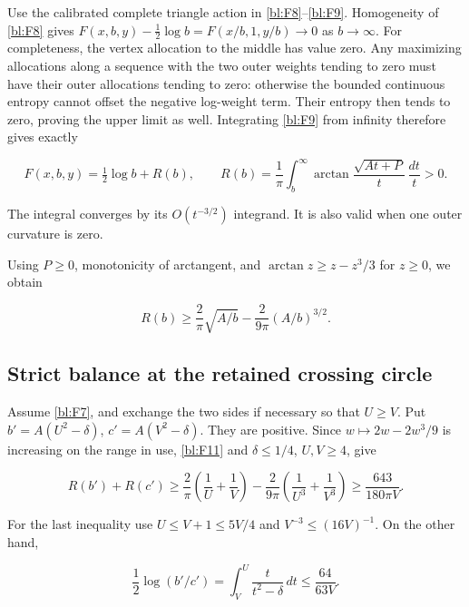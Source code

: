 Use the calibrated complete triangle action in \eqref{bl:F8}--\eqref{bl:F9}.
Homogeneity of \eqref{bl:F8} gives
\(F(x,b,y)-\tfrac12\log b=F(x/b,1,y/b)\to0\) as \(b\to\infty\).
For completeness, the vertex allocation to the middle has value zero.
Any maximizing allocations along a sequence with the two outer weights
tending to zero must have their outer allocations tending to zero:
otherwise the bounded continuous entropy cannot offset the negative
log-weight term. Their entropy then tends to zero, proving the upper
limit as well. Integrating \eqref{bl:F9} from infinity therefore gives exactly

\begin{equation}\label{bl:F10}
F(x,b,y)=\tfrac12\log b+R(b),\qquad
R(b)=\frac1\pi\int_b^\infty
\arctan\frac{\sqrt{At+P}}t\,\frac{dt}{t}>0.
\end{equation}

The integral converges by its \(O(t^{-3/2})\) integrand. It is also
valid when one outer curvature is zero.

Using \(P\ge0\), monotonicity of arctangent, and
\(\arctan z\ge z-z^3/3\) for \(z\ge0\), we obtain

\begin{equation}\label{bl:F11}
R(b)\ge \frac2\pi\sqrt{A/b}
-\frac2{9\pi}(A/b)^{3/2}.
\end{equation}

\subsection{Strict balance at the retained crossing circle}\label{bl:strict-balance-at-the-retained-crossing-circle}

Assume \eqref{bl:F7}, and exchange the two sides if necessary so that
\(U\ge V\). Put \(b'=A(U^2-\delta)\),
\(c'=A(V^2-\delta)\). They are positive. Since
\(w\mapsto 2w-2w^3/9\) is increasing on the range in use,
\eqref{bl:F11} and \(\delta\le1/4\), \(U,V\ge4\), give

\begin{equation}\label{bl:F12}
R(b')+R(c')\ge
\frac2\pi\left(\frac1U+\frac1V\right)
-\frac2{9\pi}\left(\frac1{U^3}+\frac1{V^3}\right)
\ge\frac{643}{180\pi V}.
\end{equation}

For the last inequality use \(U\le V+1\le5V/4\) and
\(V^{-3}\le(16V)^{-1}\). On the other hand,

\begin{equation}\label{bl:F13}
\frac12\log(b'/c')
=\int_V^U\frac{t}{t^2-\delta}\,dt
\le\frac{64}{63V}.
\end{equation}

